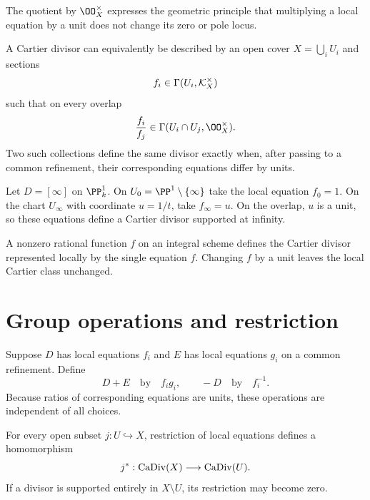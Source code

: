The quotient by \(\OO_X^\times\) expresses the geometric principle that multiplying a local equation by a unit does not change its zero or pole locus.

\begin{proposition}\label{prop:vi40-local-equations}
A Cartier divisor can equivalently be described by an open cover \(X=\bigcup_i U_i\) and sections
\[
 f_i\in\Gamma(U_i,\mathcal{K}_X^\times)
\]
such that on every overlap
\[
 \frac{f_i}{f_j}\in\Gamma(U_i\cap U_j,\OO_X^\times).
\]
Two such collections define the same divisor exactly when, after passing to a common refinement, their corresponding equations differ by units.
\end{proposition}



\begin{example}\label{ex:vi40-point-p1}
Let \(D=[\infty]\) on \(\PP^1_k\).  On \(U_0=\PP^1\setminus\{\infty\}\) take the local equation \(f_0=1\).  On the chart \(U_\infty\) with coordinate \(u=1/t\), take \(f_\infty=u\).  On the overlap, \(u\) is a unit, so these equations define a Cartier divisor supported at infinity.
\end{example}

\begin{example}\label{ex:vi40-expand-01}
A nonzero rational function $f$ on an integral scheme defines the Cartier divisor represented locally by the single equation $f$.  Changing $f$ by a unit leaves the local Cartier class unchanged.
\end{example}
\section{Group operations and restriction}
Suppose \(D\) has local equations \(f_i\) and \(E\) has local equations \(g_i\) on a common refinement.  Define
\[
 D+E\quad\text{by}\quad f_ig_i,
 \qquad
 -D\quad\text{by}\quad f_i^{-1}.
\]
Because ratios of corresponding equations are units, these operations are independent of all choices.

\begin{proposition}[Restriction]\label{prop:vi40-restriction}
For every open subset \(j:U\hookrightarrow X\), restriction of local equations defines a homomorphism
\[
 j^*:\operatorname{CaDiv}(X)\longrightarrow\operatorname{CaDiv}(U).
\]
If a divisor is supported entirely in \(X\setminus U\), its restriction may become zero.
\end{proposition}

